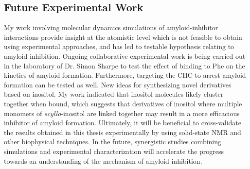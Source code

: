 \subsection{Future Experimental Work}
My work involving molecular dynamics simulations of amyloid-inhibitor interactions provide insight at the atomistic level which is not feasible to obtain using experimental approaches, and has led to testable hypothesis relating to amyloid inhibition. Ongoing collaborative experimental work is being carried out in the laboratory of Dr. Simon Sharpe to test the effect of binding to Phe on the kinetics of amyloid formation. Furthermore, targeting the CHC to arrest amyloid formation can be tested as well. %
New ideas for synthesizing novel derivatives based on inositol. My work indicated that inositol molecules likely cluster together when bound, which suggests that derivatives of inositol where multiple monomers of \textit{scyllo}-inositol are linked together may result in a more efficacious inhibitor of amyloid formation. Ultimately, it will be beneficial to cross-validate the results obtained in this thesis experimentally by using solid-state NMR and other biophysical techniques. In the future, synergistic studies combining simulations and experimental characterization will accelerate the progress towards an understanding of the mechanism of amyloid inhibition.   




